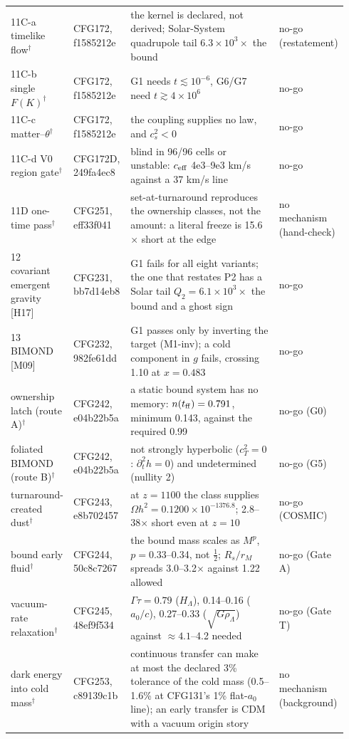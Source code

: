 \documentclass[10pt]{article}
\begin{document}
{\begin{longtable}{L{0.17\linewidth}L{0.17\linewidth}L{0.48\linewidth}L{0.12\linewidth}}
11C-a timelike flow$^\dagger$ & CFG172, f1585212e & the kernel is declared, not derived; Solar-System quadrupole tail $6.3\times10^3\times$ the bound & no-go (restatement) \\
11C-b single $F(K)^\dagger$ & CFG172, f1585212e & G1 needs $t\lesssim10^{-6}$, G6/G7 need $t\gtrsim4\times10^6$ & no-go \\
11C-c matter--$\theta^\dagger$ & CFG172, f1585212e & the coupling supplies no law, and $c_s^2<0$ & no-go \\
11C-d V0 region gate$^\dagger$ & CFG172D, 249fa4ec8 & blind in 96/96 cells or unstable: $c_{\rm eff}$ 4e3--9e3 km/s against a 37 km/s line & no-go \\
11D one-time pass$^\dagger$ & CFG251, eff33f041 & set-at-turnaround reproduces the ownership classes, not the amount: a literal freeze is 15.6$\times$ short at the edge & no mechanism (hand-check) \\
12 covariant emergent gravity [H17] & CFG231, bb7d14eb8 & G1 fails for all eight variants; the one that restates P2 has a Solar tail $Q_2=6.1\times10^3\times$ the bound and a ghost sign & no-go \\
13 BIMOND [M09] & CFG232, 982fe61dd & G1 passes only by inverting the target (M1-inv); a cold component in $g$ fails, crossing 1.10 at $x=0.483$ & no-go \\
ownership latch (route A)$^\dagger$ & CFG242, e04b22b5a & a static bound system has no memory: $n(t_{\rm ff})=0.791$, minimum 0.143, against the required 0.99 & no-go (G0) \\
foliated BIMOND (route B)$^\dagger$ & CFG242, e04b22b5a & not strongly hyperbolic ($c_T^2=0$: $\partial_t^2h=0$) and undetermined (nullity 2) & no-go (G5) \\
turnaround-created dust$^\dagger$ & CFG243, e8b702457 & at $z=1100$ the class supplies $\Omega h^2=0.1200\times10^{-1376.8}$; 2.8--38$\times$ short even at $z=10$ & no-go (COSMIC) \\
bound early fluid$^\dagger$ & CFG244, 50c8c7267 & the bound mass scales as $M^p$, $p=0.33$--0.34, not $\tfrac12$; $R_s/r_M$ spreads 3.0--3.2$\times$ against 1.22 allowed & no-go (Gate A) \\
vacuum-rate relaxation$^\dagger$ & CFG245, 48ef9f534 & $\Gamma\tau=0.79$ ($H_\Lambda$), 0.14--0.16 ($a_0/c$), 0.27--0.33 ($\sqrt{G\rho_\Lambda}$) against $\approx4.1$--4.2 needed & no-go (Gate T) \\
dark energy into cold mass$^\dagger$ & CFG253, c89139c1b & continuous transfer can make at most the declared 3\% tolerance of the cold mass (0.5--1.6\% at CFG131's 1\% flat-$a_0$ line); an early transfer is CDM with a vacuum origin story & no mechanism (background) \\
\bottomrule
\end{longtable}
}
\end{document}

